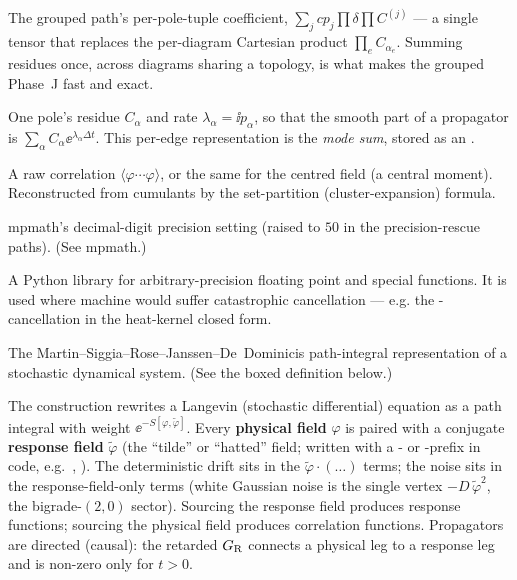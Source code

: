 \begin{description}[leftmargin=0pt,style=nextline]
  \item[Merged-residue tensor $B_\alpha$] The grouped path's per-pole-tuple
        coefficient, $\sum_j cp_j\prod\delta\prod C^{(j)}$ --- a single tensor that
        replaces the per-diagram Cartesian product $\prod_e C_{\alpha_e}$. Summing
        residues once, across diagrams sharing a topology, is what makes the grouped
        Phase~J fast and exact.

  \item[Mode $(C_\alpha,\lambda_\alpha)$ / mode sum] One pole's residue $C_\alpha$
        and rate $\lambda_\alpha=\ii p_\alpha$, so that the smooth part of a
        propagator is $\sum_\alpha C_\alpha\ee^{\lambda_\alpha\Delta t}$. This
        per-edge representation is the \emph{mode sum}, stored as an
        .

  \item[Moment] A raw correlation $\langle\varphi\cdots\varphi\rangle$, or the same
        for the centred field (a central moment). Reconstructed from cumulants by the
        set-partition (cluster-expansion) formula.

  \item[\code{mp.dps}] mpmath's decimal-digit precision setting (raised to $50$ in
        the precision-rescue paths). (See mpmath.)

  \item[mpmath] A Python library for arbitrary-precision floating point and special
        functions. It is used where machine  would suffer catastrophic
        cancellation --- e.g. the -cancellation in the heat-kernel closed
        form.

  \item[\msrjd{} action / field theory] The
        Martin--Siggia--Rose--Janssen--De~Dominicis path-integral representation of a
        stochastic dynamical system. (See the boxed definition below.)

\end{description}

\begin{defn}
The \msrjd{} construction rewrites a Langevin (stochastic differential)
equation as a path integral with weight $\ee^{-S[\varphi,\tilde\varphi]}$. Every
\textbf{physical field} $\varphi$ is paired with a conjugate \textbf{response
field} $\tilde\varphi$ (the ``tilde'' or ``hatted'' field; written with a
- or -prefix in code, e.g.\ , ). The
deterministic drift sits in the $\tilde\varphi\cdot(\dots)$ terms; the noise sits
in the response-field-only terms (white Gaussian noise is the single vertex
$-D\,\tilde\varphi^{2}$, the bigrade-$(2,0)$ sector). Sourcing the response field
produces response functions; sourcing the physical field produces correlation
functions. Propagators are directed (causal): the retarded $G_{\mathrm R}$ connects a
physical leg to a response leg and is non-zero only for $t>0$.
\end{defn}

